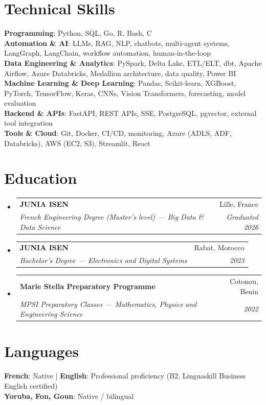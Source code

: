 \documentclass[a4paper,11pt]{article}
\makeatletter
\newcommand{\resumeSubheading}[4]{\vspace{1pt}\item
  \begin{tabular*}{0.97\textwidth}[t]{l@{\extracolsep{\fill}}r}
  {\color{primary}\textbf{#1}} & #2 \\
  \textit{\small#3} & \textit{\small #4} \\
  \end{tabular*}\vspace{-4pt}}
\newcommand{\resumeSubHeadingListStart}{\begin{itemize}[leftmargin=0.15in,label={}]}
\newcommand{\resumeSubHeadingListEnd}{\end{itemize}}
\makeatother
\begin{document}
\section{Technical Skills}
\begin{itemize}[leftmargin=0.15in,label={}]
\small{\item{
\textbf{Programming}: Python, SQL, Go, R, Bash, C \\
\textbf{Automation \& AI}: LLMs, RAG, NLP, chatbots, multi-agent systems, LangGraph, LangChain, workflow automation, human-in-the-loop \\
\textbf{Data Engineering \& Analytics}: PySpark, Delta Lake, ETL/ELT, dbt, Apache Airflow, Azure Databricks, Medallion architecture, data quality, Power BI \\
\textbf{Machine Learning \& Deep Learning}: Pandas, Scikit-learn, XGBoost, PyTorch, TensorFlow, Keras, CNNs, Vision Transformers, forecasting, model evaluation \\
\textbf{Backend \& APIs}: FastAPI, REST APIs, SSE, PostgreSQL, pgvector, external tool integration \\
\textbf{Tools \& Cloud}: Git, Docker, CI/CD, monitoring, Azure (ADLS, ADF, Databricks), AWS (EC2, S3), Streamlit, React}}
\end{itemize}

\section{Education}
\resumeSubHeadingListStart
  \resumeSubheading{JUNIA ISEN}{Lille, France}{French Engineering Degree (Master's level) --- Big Data \& Data Science}{Graduated 2026}
  \resumeSubheading{JUNIA ISEN}{Rabat, Morocco}{Bachelor's Degree --- Electronics and Digital Systems}{2023}
  \resumeSubheading{Marie Stella Preparatory Programme}{Cotonou, Benin}{MPSI Preparatory Classes --- Mathematics, Physics and Engineering Science}{2022}
\resumeSubHeadingListEnd

\section{Languages}
\begin{itemize}[leftmargin=0.15in,label={}]
\small{\item{\textbf{French}: Native \quad | \quad \textbf{English}: Professional proficiency (B2, Linguaskill Business English certified) \\
\textbf{Yoruba, Fon, Goun}: Native / bilingual}}
\end{itemize}
\end{document}

